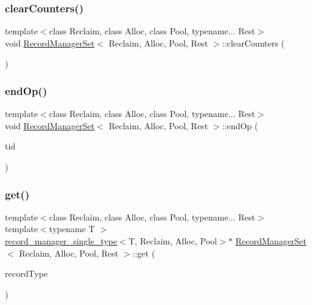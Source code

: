 \subsubsection{\texorpdfstring{clear\+Counters()}{clearCounters()}}
{\footnotesize\ttfamily template$<$class Reclaim, class Alloc, class Pool, typename... Rest$>$ \\
void \hyperlink{classRecordManagerSet}{Record\+Manager\+Set}$<$ Reclaim, Alloc, Pool, Rest $>$\+::clear\+Counters (\begin{DoxyParamCaption}\item[{void}]{ }\end{DoxyParamCaption})\hspace{0.3cm}{\ttfamily [inline]}}

\mbox{\label{classRecordManagerSet_a7a12979919638016acdad6a6d0e9f7d2}} 
\subsubsection{\texorpdfstring{end\+Op()}{endOp()}}
{\footnotesize\ttfamily template$<$class Reclaim, class Alloc, class Pool, typename... Rest$>$ \\
void \hyperlink{classRecordManagerSet}{Record\+Manager\+Set}$<$ Reclaim, Alloc, Pool, Rest $>$\+::end\+Op (\begin{DoxyParamCaption}\item[{const int}]{tid }\end{DoxyParamCaption})\hspace{0.3cm}{\ttfamily [inline]}}

\mbox{\label{classRecordManagerSet_a36b6a81acd2b1108f453b748fad29f63}} 
\subsubsection{\texorpdfstring{get()}{get()}}
{\footnotesize\ttfamily template$<$class Reclaim, class Alloc, class Pool, typename... Rest$>$ \\
template$<$typename T $>$ \\
\hyperlink{classrecord__manager__single__type}{record\+\_\+manager\+\_\+single\+\_\+type}$<$T, Reclaim, Alloc, Pool$>$$\ast$ \hyperlink{classRecordManagerSet}{Record\+Manager\+Set}$<$ Reclaim, Alloc, Pool, Rest $>$\+::get (\begin{DoxyParamCaption}\item[{T $\ast$const}]{record\+Type }\end{DoxyParamCaption})\hspace{0.3cm}{\ttfamily [inline]}}

